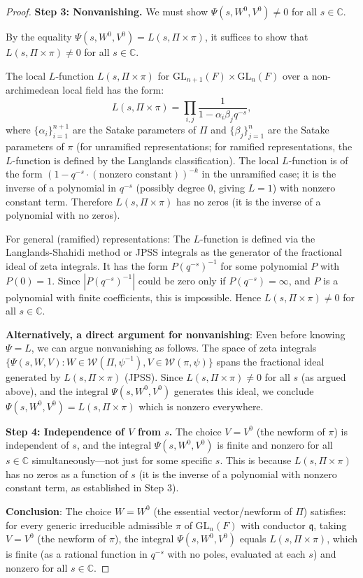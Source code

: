 \documentclass[12pt]{article}
\theoremstyle{definition}
\begin{document}
\begin{proof}
\textbf{Step 3: Nonvanishing.} We must show $\Psi(s, W^0, V^0) \neq 0$ for all $s \in \mathbb{C}$.

By the equality $\Psi(s, W^0, V^0) = L(s, \Pi \times \pi)$, it suffices to show that $L(s,\Pi\times\pi) \neq 0$ for all $s \in \mathbb{C}$.

The local $L$-function $L(s,\Pi\times\pi)$ for $\mathrm{GL}_{n+1}(F) \times \mathrm{GL}_n(F)$ over a non-archimedean local field has the form:
$$L(s,\Pi\times\pi) = \prod_{i,j} \frac{1}{1 - \alpha_i \beta_j q^{-s}},$$
where $\{\alpha_i\}_{i=1}^{n+1}$ are the Satake parameters of $\Pi$ and $\{\beta_j\}_{j=1}^n$ are the Satake parameters of $\pi$ (for unramified representations; for ramified representations, the $L$-function is defined by the Langlands classification). The local $L$-function is of the form $(1-q^{-s}\cdot(\text{nonzero constant}))^{-k}$ in the unramified case; it is the inverse of a polynomial in $q^{-s}$ (possibly degree 0, giving $L=1$) with nonzero constant term. Therefore $L(s,\Pi\times\pi)$ has no zeros (it is the inverse of a polynomial with no zeros).

For general (ramified) representations: The $L$-function is defined via the Langlands-Shahidi method or JPSS integrals as the generator of the fractional ideal of zeta integrals. It has the form $P(q^{-s})^{-1}$ for some polynomial $P$ with $P(0) = 1$. Since $|P(q^{-s})^{-1}|$ could be zero only if $P(q^{-s}) = \infty$, and $P$ is a polynomial with finite coefficients, this is impossible. Hence $L(s,\Pi\times\pi) \neq 0$ for all $s \in \mathbb{C}$.

\textbf{Alternatively, a direct argument for nonvanishing}: Even before knowing $\Psi = L$, we can argue nonvanishing as follows. The space of zeta integrals $\{\Psi(s,W,V) : W \in \mathcal{W}(\Pi,\psi^{-1}), V \in \mathcal{W}(\pi,\psi)\}$ spans the fractional ideal generated by $L(s,\Pi\times\pi)$ (JPSS). Since $L(s,\Pi\times\pi) \neq 0$ for all $s$ (as argued above), and the integral $\Psi(s,W^0,V^0)$ generates this ideal, we conclude $\Psi(s,W^0,V^0) = L(s,\Pi\times\pi)$ which is nonzero everywhere.

\textbf{Step 4: Independence of $V$ from $s$.} The choice $V = V^0$ (the newform of $\pi$) is independent of $s$, and the integral $\Psi(s,W^0,V^0)$ is finite and nonzero for all $s \in \mathbb{C}$ simultaneously—not just for some specific $s$. This is because $L(s,\Pi\times\pi)$ has no zeros as a function of $s$ (it is the inverse of a polynomial with nonzero constant term, as established in Step 3).

\textbf{Conclusion}: The choice $W = W^0$ (the essential vector/newform of $\Pi$) satisfies: for every generic irreducible admissible $\pi$ of $\mathrm{GL}_n(F)$ with conductor $\mathfrak{q}$, taking $V = V^0$ (the newform of $\pi$), the integral $\Psi(s, W^0, V^0)$ equals $L(s,\Pi\times\pi)$, which is finite (as a rational function in $q^{-s}$ with no poles, evaluated at each $s$) and nonzero for all $s \in \mathbb{C}$.
\end{proof}
\end{document}
